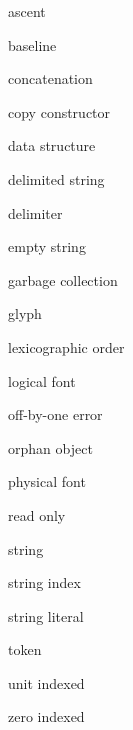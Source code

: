 \begin{KT}
ascent

baseline

concatenation

copy constructor 

data structure

delimited string

delimiter

empty string

garbage collection 

glyph

lexicographic order

logical font

off-by-one error

orphan object

physical font

read only

string

string index

string literal

token

unit indexed

zero indexed

\end{KT}



